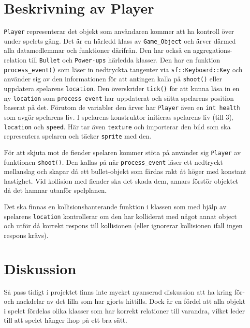 \documentclass{TDP003mall}
\begin{document}
\section{Beskrivning av Player}
\texttt{Player} representerar det objekt som användaren kommer att ha kontroll över under spelets gång. 
Det är en härledd klass av \texttt{Game\_Object} och ärver därmed alla datamedlemmar och funktioner därifrån. 
Den har också en aggregations-relation till \texttt{Bullet} och \texttt{Power-ups} härledda klasser.
Den har en funktion \texttt{process\_event()} som läser in nedtryckta tangenter via \texttt{sf::Keyboard::Key} 
och använder sig av den informationen för att antingen kalla på \texttt{shoot()} eller uppdatera spelarens \texttt{location}. 
Den överskrider \texttt{tick()} för att kunna läsa in en ny \texttt{location} som \texttt{process\_event} har uppdaterat och sätta spelarens position baserat på det.
Förutom de variabler den ärver har \texttt{Player} även en \texttt{int health} som avgör spelarens liv. 
I spelarens konstruktor initieras spelarens liv (till 3), \texttt{location} och \texttt{speed}.
Här tar även \texttt{texture} och importerar den bild som ska representera spelaren och täcker \texttt{sprite} med den.

För att skjuta mot de fiender spelaren kommer stöta på använder sig \texttt{Player} av funktionen \texttt{shoot()}. 
Den kallas på när \texttt{process\_event} läser ett nedtryckt mellanslag och skapar då ett bullet-objekt 
som färdas rakt åt höger med konstant hastighet. Vid kollision med fiender ska det skada dem, 
annars förstör objektet då det hamnar utanför spelplanen.

Det ska finnas en kollisionshanterande funktion i klassen som med hjälp av spelarens \texttt{location} kontrollerar om den har kolliderat med något annat object 
och utför då korrekt respons till kollisionen (eller ignorerar kollisionen ifall ingen respons krävs). 
\section{Diskussion}
Så pass tidigt i projektet finns inte mycket nyanserad diskussion att ha kring för- och nackdelar av det lilla som har gjorts hittills. 
Dock är en fördel att alla objekt i spelet fördelas olika klasser som har korrekt relationer till varandra, vilket leder till att spelet hänger ihop på ett bra sätt.
\end{document}
